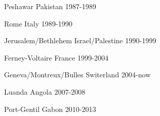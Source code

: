 


\begin{cvhonors}


\cvhonor
{Peshawar} %
{Pakistan} %
{} %
{1987-1989} %
    

\cvhonor
{Rome} %
{Italy} %
{} %
{1989-1990} %


\cvhonor
{Jerusalem/Bethlehem} %
{Israel/Palestine} %
{} %
{1990-1999} %


\cvhonor
{Ferney-Voltaire} %
{France} %
{} %
{1999-2004} %


\cvhonor
{Geneva/Montreux/Bulles} %
{Switerland} %
{} %
{2004-now} %



\cvhonor
{Luanda} %
{Angola} %
{} %
{2007-2008} %



\cvhonor
{Port-Gentil} %
{Gabon} %
{} %
{2010-2013} %


\end{cvhonors}